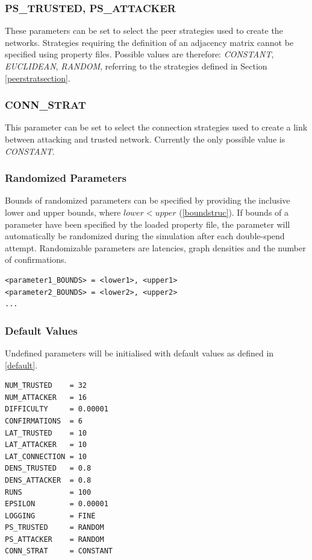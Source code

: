 \documentclass[a4paper,12pt,twoside]{report}
\begin{document}
\subsubsection{PS\_TRUSTED, PS\_ATTACKER}
These parameters can be set to select the peer strategies used to create the networks. Strategies requiring the definition of an adjacency matrix cannot be specified using property files. Possible values are therefore: \textit{CONSTANT}, \textit{EUCLIDEAN}, \textit{RANDOM}, referring to the strategies defined in Section \ref{peerstratsection}.
\subsubsection{CONN\_STRAT}
This parameter can be set to select the connection strategies used to create a link between attacking and trusted network. Currently the only possible value is \textit{CONSTANT}.
\subsubsection{Randomized Parameters}
Bounds of randomized parameters can be specified by providing the inclusive lower and upper bounds, where $lower < upper$ (\autoref{boundstruc}). If bounds of a parameter have been specified by the loaded property file, the parameter will automatically be randomized during the simulation after each double-spend attempt. Randomizable parameters are latencies, graph densities and the number of confirmations.
\begin{lstlisting}[caption=Defining bounds of randomized parameters,label=boundstruc]
<parameter1_BOUNDS> = <lower1>, <upper1>
<parameter2_BOUNDS> = <lower2>, <upper2>
...
\end{lstlisting}
\subsubsection{Default Values}\label{defaultval}
Undefined parameters will be initialised with default values as defined in \autoref{default}. 
\begin{lstlisting}[caption=Default parameter values,label=default]
NUM_TRUSTED    = 32
NUM_ATTACKER   = 16
DIFFICULTY     = 0.00001
CONFIRMATIONS  = 6
LAT_TRUSTED    = 10
LAT_ATTACKER   = 10
LAT_CONNECTION = 10
DENS_TRUSTED   = 0.8
DENS_ATTACKER  = 0.8
RUNS           = 100
EPSILON        = 0.00001
LOGGING        = FINE
PS_TRUSTED     = RANDOM
PS_ATTACKER    = RANDOM
CONN_STRAT     = CONSTANT
\end{lstlisting}
\end{document}
